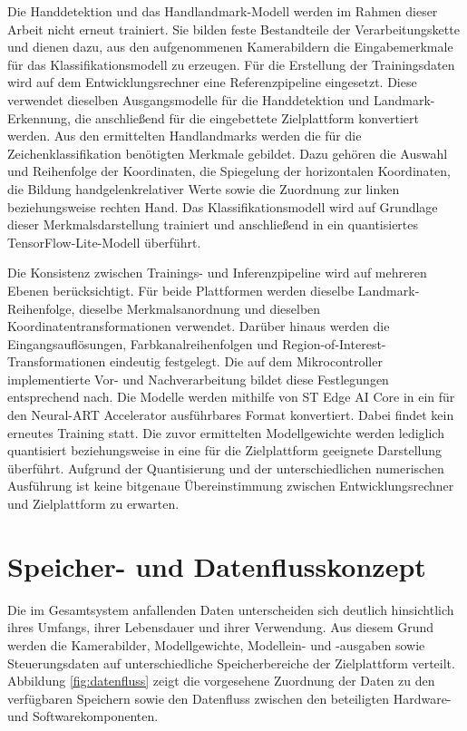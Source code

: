Die Handdetektion und das Handlandmark-Modell werden im Rahmen dieser Arbeit nicht erneut trainiert. Sie bilden feste Bestandteile der Verarbeitungskette und dienen dazu, aus den aufgenommenen Kamerabildern die Eingabemerkmale für das Klassifikationsmodell zu erzeugen. Für die Erstellung der Trainingsdaten wird auf dem Entwicklungsrechner eine Referenzpipeline eingesetzt. Diese verwendet dieselben Ausgangsmodelle für die Handdetektion und Landmark-Erkennung, die anschließend für die eingebettete Zielplattform konvertiert werden. Aus den ermittelten Handlandmarks werden die für die Zeichenklassifikation benötigten Merkmale gebildet. Dazu gehören die Auswahl und Reihenfolge der Koordinaten, die Spiegelung der horizontalen Koordinaten, die Bildung handgelenkrelativer Werte sowie die Zuordnung zur linken beziehungsweise rechten Hand. Das Klassifikationsmodell wird auf Grundlage dieser Merkmalsdarstellung trainiert und anschließend in ein quantisiertes TensorFlow-Lite-Modell überführt.

Die Konsistenz zwischen Trainings- und Inferenzpipeline wird auf mehreren Ebenen berücksichtigt. Für beide Plattformen werden dieselbe Landmark-Reihenfolge, dieselbe Merkmalsanordnung und dieselben Koordinatentransformationen verwendet. Darüber hinaus werden die Eingangsauflösungen, Farbkanalreihenfolgen und Region-of-Interest-Transformationen eindeutig festgelegt. Die auf dem Mikrocontroller implementierte Vor- und Nachverarbeitung bildet diese Festlegungen entsprechend nach. Die Modelle werden mithilfe von ST Edge AI Core in ein für den Neural-ART Accelerator ausführbares Format konvertiert. Dabei findet kein erneutes Training statt. Die zuvor ermittelten Modellgewichte werden lediglich quantisiert beziehungsweise in eine für die Zielplattform geeignete Darstellung überführt. Aufgrund der Quantisierung und der unterschiedlichen numerischen Ausführung ist keine bitgenaue Übereinstimmung zwischen Entwicklungsrechner und Zielplattform zu erwarten.

\section{Speicher- und Datenflusskonzept}\label{sec:speicher-datenfluss}

Die im Gesamtsystem anfallenden Daten unterscheiden sich deutlich hinsichtlich ihres Umfangs, ihrer Lebensdauer und ihrer Verwendung. Aus diesem Grund werden die Kamerabilder, Modellgewichte, Modellein- und -ausgaben sowie Steuerungsdaten auf unterschiedliche Speicherbereiche der Zielplattform verteilt. Abbildung \ref{fig:datenfluss} zeigt die vorgesehene Zuordnung der Daten zu den verfügbaren Speichern sowie den Datenfluss zwischen den beteiligten Hardware- und Softwarekomponenten.

